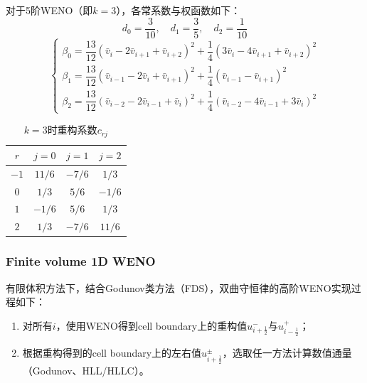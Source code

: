 \documentclass[11pt]{article}
\begin{document}
对于5阶WENO（即$k=3$），各常系数与权函数如下：
\begin{equation}
	d_0=\frac{3}{10},\quad d_1=\frac{3}{5},\quad d_2=\frac{1}{10}
\end{equation}
\begin{equation}
	\left\{\begin{array}{l}
		\beta_0 =\dfrac{13}{12}\left(\bar{v}_{i}-2\bar{v}_{i+1}+\bar{v}_{i+2}\right)^2+\dfrac{1}{4}\left(3\bar{v}_{i}-4\bar{v}_{i+1}+\bar{v}_{i+2}\right)^2 \\[8pt]
		\beta_1 =\dfrac{13}{12}\left(\bar{v}_{i-1}-2\bar{v}_{i}+\bar{v}_{i+1}\right)^2+\dfrac{1}{4}\left(\bar{v}_{i-1}-\bar{v}_{i+1}\right)^2               \\[8pt]
		\beta_2 =\dfrac{13}{12}\left(\bar{v}_{i-2}-2\bar{v}_{i-1}+\bar{v}_{i}\right)^2+\dfrac{1}{4}\left(\bar{v}_{i-2}-4\bar{v}_{i-1}+3\bar{v}_{i}\right)^2
	\end{array}\right.
\end{equation}
\begin{table}[htbp]
	\centering
	\caption{\label{tab:crj}$k=3$时重构系数$c_{rj}$}\vspace{1ex}
	\begin{tabular}{cccc}
		\toprule
		$r$  & $j=0$  & $j=1$  & $j=2$  \\
		\midrule
		$-1$ & $11/6$ & $-7/6$ & $1/3$  \\
		$0$  & $1/3$  & $5/6$  & $-1/6$ \\
		$1$  & $-1/6$ & $5/6$  & $1/3$  \\
		$2$  & $1/3$  & $-7/6$ & $11/6$ \\
		\bottomrule
	\end{tabular}
\end{table}

\subsubsection{Finite volume 1D WENO}
有限体积方法下，结合Godunov类方法（FDS），双曲守恒律的高阶WENO实现过程如下：
\begin{enumerate}
	\item 对所有$i$，使用WENO得到cell boundary上的重构值$u_{i+\frac{1}{2}}^-$与$u_{i-\frac{1}{2}}^+$；
	\item 根据重构得到的cell boundary上的左右值$u_{i+\frac{1}{2}}^\pm$，选取任一方法计算数值通量（Godunov、HLL/HLLC）。
\end{enumerate}
\end{document}
